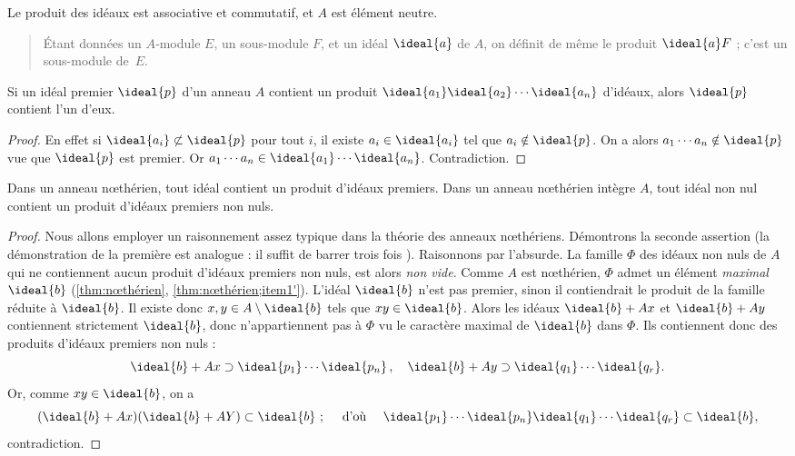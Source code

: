 \documentclass[11pt, %
  title in boldface,
  theorem in new line,
  theorem numbering = section,
  number theorems separately,
  simple name,
]{beaulivre}
\begin{document}
    Le produit des idéaux est associative et commutatif, et \( A \) est élément neutre.

    \begin{quote}
        Étant données un \( A \)‑module \( E \), un sous-module \( F \), et un idéal \( \ideal{a} \) de \( A \), on définit de même le produit \( \ideal{a} F \) ; c'est un sous-module de~\( E \).
    \end{quote}

    \begin{lemma}\label{lem:idéal premier qui contient un produit d'idéaux contient l'un d'eux}
        Si un idéal premier \( \ideal{p} \) d'un anneau \( A \) contient un produit \( \ideal{a_1} \ideal{a_2} \cdots \ideal{a_n} \) d'idéaux, alors \( \ideal{p} \) contient l'un d'eux.
    \end{lemma}
    \begin{proof}
        En effet si \( \ideal{a_i} \not\subset \ideal{p} \) pour tout \( i \), il existe \( a_i \in \ideal{a_i} \) tel que \( a_i \notin \ideal{p} \). On a alors \( a_1 \cdots a_n \notin \ideal{p} \) vue que \( \ideal{p} \) est premier. Or \( a_1 \cdots a_n \in \ideal{a_1} \cdots \ideal{a_n} \). Contradiction.
    \end{proof}

    \begin{lemma}\label{lem:anneau nœthérien;tout idéal contient un produit d'idéaux premiers}
        Dans un anneau nœthérien, tout idéal contient un produit d'idéaux premiers. Dans un anneau nœthérien intègre \( A \), tout idéal non nul contient un produit d'idéaux premiers non nuls.
    \end{lemma}
    \begin{proof}
        Nous allons employer un raisonnement assez typique dans la théorie des anneaux nœthériens. Démontrons la seconde assertion (la démonstration de la première est analogue : il suffit de barrer trois fois ). Raisonnons par l'absurde. La famille \( \Phi \) des idéaux non nuls de \( A \) qui ne contiennent aucun produit d'idéaux premiers non nuls, est alors \emph{non vide}. Comme \( A \) est nœthérien, \( \Phi \) admet un élément \emph{maximal} \( \ideal{b} \) (\cref{thm:nœthérien}, \ref{thm:nœthérien;item1'}). L'idéal \( \ideal{b} \) n'est pas premier, sinon il contiendrait le produit de la famille réduite à \( \ideal{b} \). Il existe donc \( x, y \in A \setminus \ideal{b} \) tels que \( xy \in \ideal{b} \). Alors les idéaux \( \ideal{b}+Ax \) et \( \ideal{b}+Ay \) contiennent strictement \( \ideal{b} \), donc n'appartiennent pas à \( \Phi \) vu le caractère maximal de \( \ideal{b} \) dans \( \Phi \). Ils contiennent donc des produits d'idéaux premiers non nuls :
        \[
            \ideal{b}+Ax \supset \ideal{p_1} \cdots \ideal{p_n}\,, \quad
            \ideal{b}+Ay \supset \ideal{q_1} \cdots \ideal{q_r}.
        \]
        Or, comme \( xy \in \ideal{b} \), on a
        \[
            (\ideal{b}+Ax)(\ideal{b}+AY) \subset \ideal{b} ~;
            \quad \text{ d'où } \quad
            \ideal{p_1} \cdots \ideal{p_n} \ideal{q_1} \cdots \ideal{q_r} \subset \ideal{b},
        \]
        contradiction.
    \end{proof}
\end{document}
